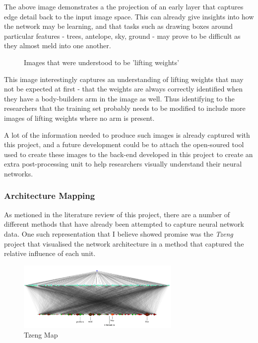 \documentclass[a4paper,11pt,titlepage]{article}
\begin{document}
	The above image demonstrates a the projection of an early layer that captures edge detail back to the input image space. This can already give insights into how the network may be learning, and that tasks such as drawing boxes around particular features - trees, antelope, sky, ground - may prove to be difficult as they almost meld into one another.
	
		\begin{figure}[H]
    			\caption{Images that were understood to be 'lifting weights'}%
	\end{figure}	
	
	This image interestingly captures an understanding of lifting weights that may not be expected at first - that the weights are always correctly identified when they have a body-builders arm in the image as well. Thus identifying to the researchers that the training set probably needs to be modified to include more images of lifting weights where no arm is present.
	\par 
	A lot of the information needed to produce such images is already captured with this project, and a future development could be to attach the open-soured tool used to create these images to the back-end developed in this project to create an extra post-processing unit to help researchers visually understand their neural networks.
	
	\subsubsection{Architecture Mapping}
	
	As metioned in the literature review of this project, there are a number of different methods that have already been attempted to capture neural network data. One such representation that I believe showed promise was the \textit{Tzeng} project that visualised the network architecture in a method that captured the relative influence of each unit.
	
	\begin{figure}[H]
		\centering 
    		\includegraphics[width=0.7\textwidth]{img/tzeng_large_map.png} 
    		\caption{Tzeng Map}%
 	\end{figure}
 	
\end{document}
